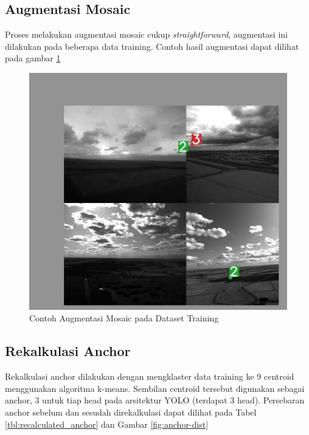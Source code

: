 \subsection{Augmentasi Mosaic}
  Proses melakukan augmentasi mosaic cukup \emph{straightforward},
  augmentasi ini dilakukan pada beberapa data training.
  Contoh hasil augmentasi dapat dilihat pada gambar \ref{fig:mosaic-train}
  \begin{figure}[H]
    \centering
    \includegraphics[scale=0.4]{figures/mosaic-aug-2.png}
    \caption{Contoh Augmentasi Mosaic pada Dataset Training}
    \label{fig:mosaic-train}
  \end{figure}

\subsection{Rekalkulasi Anchor}
  Rekalkulasi anchor dilakukan dengan mengklaster data training ke 9 centroid menggunakan algoritma k-means.
  Sembilan centroid tersebut digunakan sebagai anchor, 3 untuk tiap head pada arsitektur YOLO (terdapat 3 head).
  Persebaran anchor sebelum dan sesudah direkalkulasi dapat dilihat 
  pada Tabel \ref{tbl:recalculated_anchor} dan Gambar \ref{fig:anchor-dist}

